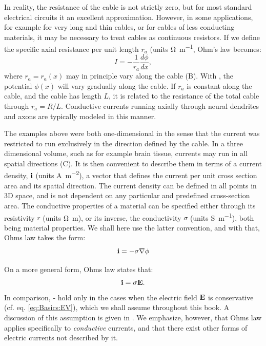 In reality, the resistance of the cable is not strictly zero, but for most standard electrical circuits it an excellent approximation. However, in some applications, for example for very long and thin cables, or for cables of less conducting materials, it may be necessary to treat cables as continuous resistors. If we define the specific axial resistance per unit length $r_{a}$ (units \si{\ohm\per\metre}, Ohm's law becomes: 
\begin{equation}
I = - \frac{1}{r_a}\frac{d\phi}{dx}, 
\label{eq:Basics:Ohm_r}
\end{equation}
where $r_a=r_a(x)$ may in principle vary along the cable (B). With , the potential $\phi(x)$ will vary gradually along the cable. If $r_a$ is constant along the cable, and the cable has length $L$, it is related to the resistance of the total cable through $r_a=R/L$. Conductive currents running axially through neural dendrites and axons are typically modeled in this manner. 

The examples above were both one-dimensional in the sense that the current was restricted to run exclusively in the direction defined by the cable. In a three dimensional volume, such as for example brain tissue, currents may run in all spatial directions (C). It is then convenient to describe them in terms of a current density, ${\bf i}$ (units \si{\ampere\per\square\metre}), a vector that defines the current per unit cross section area and its spatial direction. The current density can be defined in all points in 3D space, and is not dependent on any particular and predefined cross-section area. The conductive properties of a material can be specified either through its resistivity $r$ (units \si{\ohm\metre}), or its inverse, the conductivity $\sigma$ (units \si{\siemens\per\metre}), both being material properties. We shall here use the latter convention, and with that, Ohms law takes the form:
\begin{equation}
{\bf i} = - \sigma {\bf \nabla} \phi
\label{eq:Basics:Ohm_3D_phi}
\end{equation}

On a more general form, Ohms law states that:
\begin{equation}
{\bf i} = \sigma {\bf E}.
\label{eq:Basics:Ohm_general}
\end{equation}
In comparison, - hold only in the cases when the electric field ${\bf E}$ is conservative (cf. eq. \ref{eq:Basics:EV}), which we shall assume throughout this book. A discussion of this assumption is given in . We emphasize, however, that Ohms law applies specifically to \textit{conductive} currents, and that there exist other forms of electric currents not described by it.


